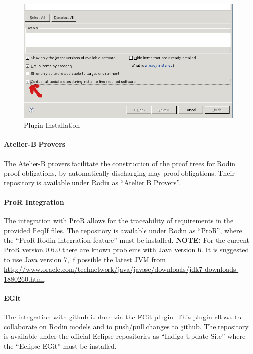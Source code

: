 \documentclass[10pt,a4paper]{article}
\begin{document}
\begin{figure}[ht]
  \centering
  \includegraphics[width=.75\textwidth]{install-plugin}
  \caption{Plugin Installation}
  \label{fig:plugin-install}
\end{figure}

\paragraph{Atelier-B Provers}
\label{sec:atelier-b-provers}

The Atelier-B provers facilitate the construction of the proof trees for Rodin
proof obligations, by automatically discharging may proof obligations. Their
repository is available under Rodin as ``Atelier B Provers''.

\paragraph{ProR Integration}
\label{sec:pror-integration}

The integration with ProR allows for the traceability of requirements in the
provided ReqIf files. The repository is available under Rodin as ``ProR'', where
the ``ProR Rodin integration feature'' must be installed. {\bf NOTE: } For the
current ProR version 0.6.0 there are known problems with Java version 6. It is
suggested to use Java version 7, if possible the latest JVM from
\url{http://www.oracle.com/technetwork/java/javase/downloads/jdk7-downloads-1880260.html}.

\paragraph{EGit}
\label{sec:egit}

The integration with github is done via the EGit plugin. This plugin allows to
collaborate on Rodin models and to push/pull changes to github. The repository
is available under the official Eclipse repositories as ``Indigo Update Site''
where the ``Eclipse EGit'' must be installed.
\end{document}

